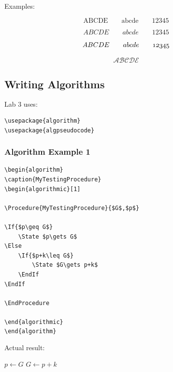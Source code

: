 \documentclass[a4paper,10pt]{article}
\begin{document}
Examples:

\[
\mathrm{ABCDE \qquad abcde \qquad 12345}
\]

\[
\mathit{ABCDE \qquad abcde \qquad 12345}
\]

\[
\mathnormal{ABCDE \qquad abcde \qquad 12345}
\]

\[
\mathcal{ABCDE}
\]


\subsection{Writing Algorithms}

Lab 3 uses:

\begin{verbatim}
\usepackage{algorithm}
\usepackage{algpseudocode}
\end{verbatim}

\subsubsection{Algorithm Example 1}

\begin{verbatim}
\begin{algorithm}
\caption{MyTestingProcedure}
\begin{algorithmic}[1]

\Procedure{MyTestingProcedure}{$G$,$p$}

\If{$p\geq G$}
    \State $p\gets G$
\Else
    \If{$p+k\leq G$}
        \State $G\gets p+k$
    \EndIf
\EndIf

\EndProcedure

\end{algorithmic}
\end{algorithm}
\end{verbatim}

Actual result:

\begin{algorithm}
\caption{MyTestingProcedure}
\begin{algorithmic}[1]


    \State $p\gets G$
\Else
        \State $G\gets p+k$
    \EndIf
\EndIf

\EndProcedure

\end{algorithmic}
\end{algorithm}
\end{document}
